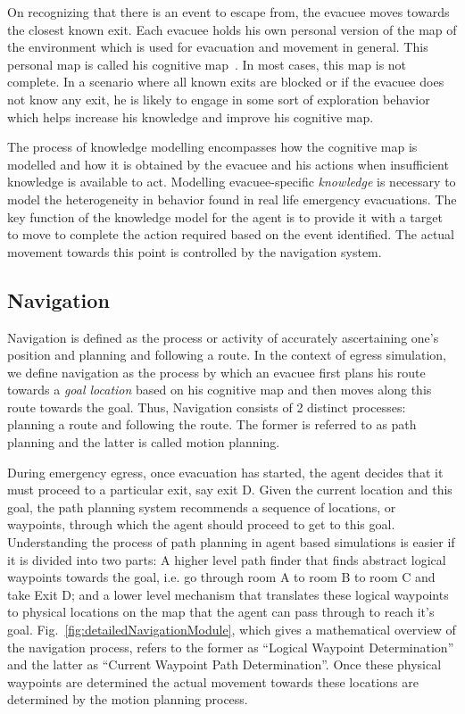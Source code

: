 	On recognizing that there is an event to escape from, the evacuee moves towards the closest known exit. Each evacuee holds his own personal version of the map of the environment which is used for evacuation and movement in general. This personal map is called his cognitive map~\cite{CognitiveMapCitation}. In most cases, this map is not complete. In a scenario where all known exits are blocked or if the evacuee does not know any exit, he is likely to engage in some sort of exploration behavior which helps increase his knowledge and improve his cognitive map.

    The process of knowledge modelling encompasses how the cognitive map is modelled and how it is obtained by the evacuee and his actions when insufficient knowledge is available to act. Modelling evacuee-specific \emph{knowledge} is necessary to model the heterogeneity in behavior found in real life emergency evacuations. The key function of the knowledge model for the agent is to provide it with a target to move to complete the action required based on the event identified. The actual movement towards this point is controlled by the navigation system.


\subsection{Navigation}
\label{IBEVAC:Navigation}

	Navigation is defined as the process or activity of accurately ascertaining one's position and planning and following a route. In the context of egress simulation, we define navigation as the process by which an evacuee first plans his route towards a \emph{goal location} based on his cognitive map and then moves along this route towards the goal. Thus, Navigation consists of 2 distinct processes: planning a route and following the route. The former is referred to as path planning and the latter is called motion planning.

    During emergency egress, once evacuation has started, the agent decides that it must proceed to a particular exit, say exit D. Given the current location and this goal, the path planning system recommends a sequence of locations, or waypoints, through which the agent should proceed to get to this goal. Understanding the process of path planning in agent based simulations is easier if it is divided into two parts:  A higher level path finder that finds abstract logical waypoints towards the goal, i.e. go through room A to room B to room C and take Exit D; and a lower level mechanism that translates these logical waypoints to physical locations on the map that the agent can pass through to reach it's goal. Fig.~\ref{fig:detailedNavigationModule}, which gives a mathematical overview of the navigation process, refers to the former as ``Logical Waypoint Determination'' and the latter as ``Current Waypoint Path Determination''. Once these physical waypoints are determined the actual movement towards these locations are determined by the motion planning process.


